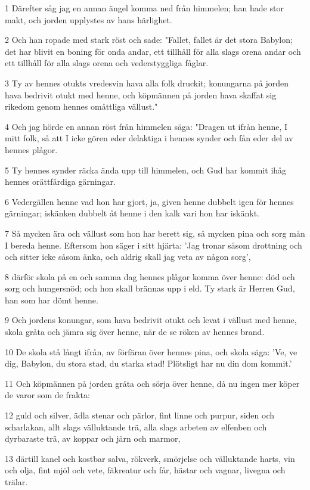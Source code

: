 \par 1 Därefter såg jag en annan ängel komma ned från himmelen; han hade stor makt, och jorden upplystes av hans härlighet.
\par 2 Och han ropade med stark röst och sade: "Fallet, fallet är det stora Babylon; det har blivit en boning för onda andar, ett tillhåll för alla slags orena andar och ett tillhåll för alla slags orena och vederstyggliga fåglar.
\par 3 Ty av hennes otukts vredesvin hava alla folk druckit; konungarna på jorden hava bedrivit otukt med henne, och köpmännen på jorden hava skaffat sig rikedom genom hennes omåttliga vällust."
\par 4 Och jag hörde en annan röst från himmelen säga: "Dragen ut ifrån henne, I mitt folk, så att I icke gören eder delaktiga i hennes synder och fån eder del av hennes plågor.
\par 5 Ty hennes synder räcka ända upp till himmelen, och Gud har kommit ihåg hennes orättfärdiga gärningar.
\par 6 Vedergällen henne vad hon har gjort, ja, given henne dubbelt igen för hennes gärningar; iskänken dubbelt åt henne i den kalk vari hon har iskänkt.
\par 7 Så mycken ära och vällust som hon har berett sig, så mycken pina och sorg mån I bereda henne. Eftersom hon säger i sitt hjärta: 'Jag tronar såsom drottning och och sitter icke såsom änka, och aldrig skall jag veta av någon sorg',
\par 8 därför skola på en och samma dag hennes plågor komma över henne: död och sorg och hungersnöd; och hon skall brännas upp i eld. Ty stark är Herren Gud, han som har dömt henne.
\par 9 Och jordens konungar, som hava bedrivit otukt och levat i vällust med henne, skola gråta och jämra sig över henne, när de se röken av hennes brand.
\par 10 De skola stå långt ifrån, av förfäran över hennes pina, och skola säga: 'Ve, ve dig, Babylon, du stora stad, du starka stad! Plötsligt har nu din dom kommit.'
\par 11 Och köpmännen på jorden gråta och sörja över henne, då nu ingen mer köper de varor som de frakta:
\par 12 guld och silver, ädla stenar och pärlor, fint linne och purpur, siden och scharlakan, allt slags välluktande trä, alla slags arbeten av elfenben och dyrbaraste trä, av koppar och järn och marmor,
\par 13 därtill kanel och kostbar salva, rökverk, smörjelse och välluktande harts, vin och olja, fint mjöl och vete, fäkreatur och får, hästar och vagnar, livegna och trälar.
